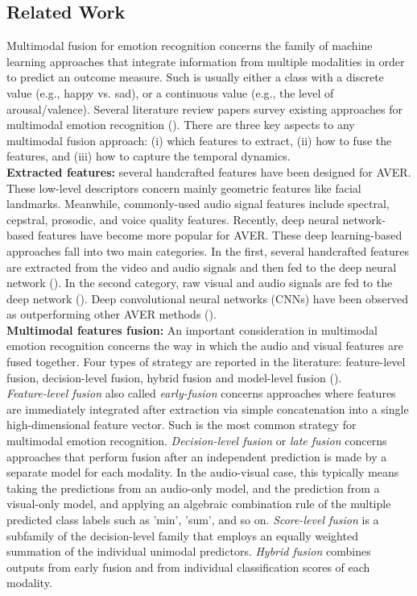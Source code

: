 \documentclass[times,twocolumn,final,authoryear]{elsarticle}
\begin{document}
	\subsection{Related Work}
	Multimodal fusion for emotion recognition concerns the family of machine learning approaches that integrate information from multiple modalities in order to predict an outcome measure. Such is usually either a class with a discrete value (e.g., happy vs. sad), or a continuous value (e.g., the level of arousal/valence).  Several literature review papers survey existing approaches for multimodal emotion recognition (\cite{RouastSurvey, Baltrusaitis2018, Zeng2008,Poria2017}). There are three key aspects to any multimodal fusion approach: (i) which features to extract, (ii) how to fuse the features, and (iii) how to capture the temporal dynamics.\\
	\textbf{Extracted features:}  several handcrafted features have been designed for AVER. These low-level descriptors concern mainly geometric features like facial landmarks. Meanwhile, commonly-used audio signal features include spectral, cepstral, prosodic, and voice quality features.
	Recently, deep neural network-based features have become more popular for AVER. These deep learning-based approaches fall into two main categories. In the first, several handcrafted features are extracted from the video and audio signals and then fed to the deep neural network (\cite{Ringeval2015, He2015, Rejaibi2019, rejaibi2019mfcc, Muzammel2020}). In the second category, raw visual and audio signals are fed to the deep network (\cite{Tzarakis2017, Tzirakis2018, Basnet2019}). Deep convolutional neural networks (CNNs) have been observed as outperforming other AVER methods (\cite{RouastSurvey}).\\
	\textbf{Multimodal features fusion:}  An important consideration in multimodal emotion recognition concerns the way in which the audio and visual features are fused together. Four types of strategy are reported in the literature: feature-level fusion, decision-level fusion, hybrid fusion and model-level fusion (\cite{Zhang2017, Poria2017}). \\ \textit{Feature-level fusion} also called \textit{early-fusion} concerns approaches where features are immediately integrated after extraction via simple concatenation into a single high-dimensional feature vector. Such is the most common strategy for multimodal emotion recognition. \textit{Decision-level fusion} or \textit{late fusion} concerns approaches that perform fusion after an independent prediction is made by a separate model for each modality. In the audio-visual case, this typically means taking the predictions from an audio-only model, and the prediction from a visual-only model, and applying an algebraic combination rule of the multiple predicted class labels such as 'min', 'sum', and so on. \textit{Score-level fusion} is a subfamily of the decision-level family that employs an equally weighted summation of the individual unimodal predictors. \textit{Hybrid fusion} combines outputs from early fusion and from individual classification scores of each modality. 
\end{document}
